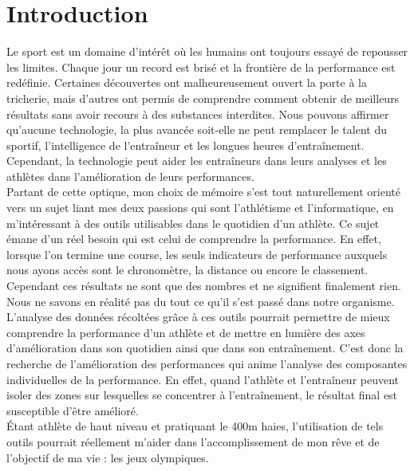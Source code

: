 \chapter*{Introduction}
\label{chap:introduction}

Le sport est un domaine d'intérêt où les humains ont toujours essayé de repousser les limites. Chaque jour un record est brisé et la frontière de la performance est redéfinie.
Certaines découvertes ont malheureusement ouvert la porte à la tricherie, mais d’autres ont permis de comprendre comment obtenir de meilleurs résultats sans avoir recours à des substances interdites. Nous pouvons affirmer qu'aucune technologie, la plus avancée soit-elle ne peut remplacer le talent du sportif, l'intelligence de l’entraîneur et les longues heures d’entraînement. Cependant, la technologie peut aider les entraîneurs dans leurs analyses et les athlètes dans l'amélioration de leurs performances.\\

Partant de cette optique, mon choix de mémoire s'est tout naturellement orienté vers un sujet liant mes deux passions qui sont l'athlétisme et l'informatique, en m'intéressant à des outils utilisables dans le quotidien d'un athlète.
Ce sujet émane d'un réel besoin qui est celui de comprendre la performance. En effet, lorsque l'on termine une course, les seuls indicateurs de performance auxquels nous ayons accès sont le chronomètre, la distance ou encore le classement. Cependant ces résultats ne sont que des nombres et ne signifient finalement rien. Nous ne savons en réalité pas du tout ce qu'il s'est passé dans notre organisme. L'analyse des données récoltées grâce à ces outils pourrait permettre de mieux comprendre la performance d'un athlète et de mettre en lumière des axes d'amélioration dans son quotidien ainsi que dans son entraînement. 
C'est donc la recherche de l'amélioration des performances qui anime l'analyse des composantes individuelles de la performance. En effet, quand l'athlète et l'entraîneur peuvent isoler des zones sur lesquelles se concentrer à l'entraînement, le résultat final est susceptible d'être amélioré.\\

Étant athlète de haut niveau et pratiquant le 400m haies, l'utilisation de tels outils pourrait réellement m'aider dans l'accomplissement de mon rêve et de l'objectif de ma vie : les jeux olympiques.\\

